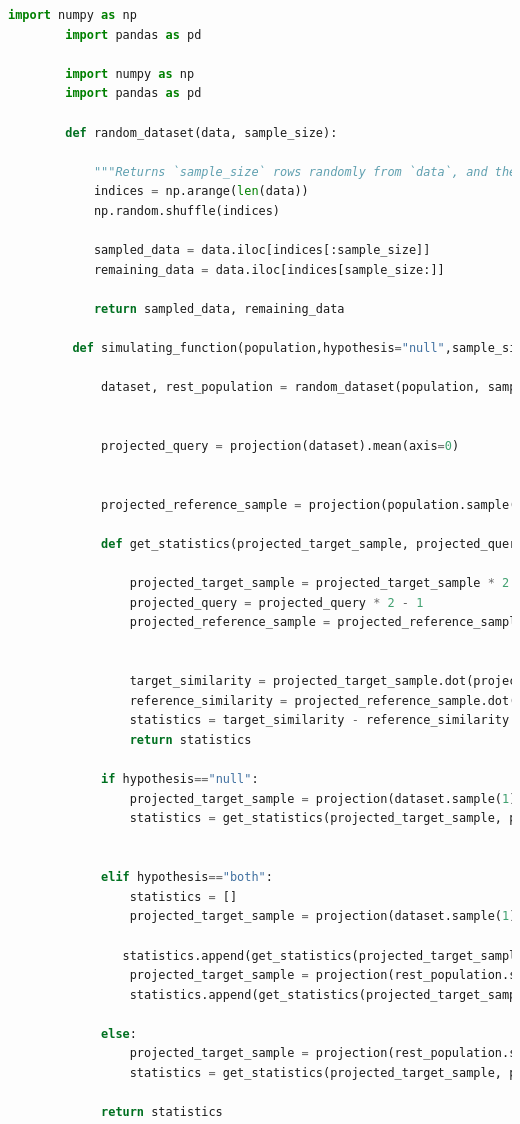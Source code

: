 \documentclass[12pt]{extarticle}
\begin{document}
	\begin{lstlisting}[language=Python]	
		import numpy as np
		import pandas as pd
		
		import numpy as np
		import pandas as pd
		
		def random_dataset(data, sample_size):
		
			"""Returns `sample_size` rows randomly from `data`, and the rest"""
			indices = np.arange(len(data))
			np.random.shuffle(indices)
			
			sampled_data = data.iloc[indices[:sample_size]]
			remaining_data = data.iloc[indices[sample_size:]]
			
			return sampled_data, remaining_data

		 def simulating_function(population,hypothesis="null",sample_size=5):	 
		 
			 dataset, rest_population = random_dataset(population, sample_size)
			 
			 
			 projected_query = projection(dataset).mean(axis=0)
			 
			 
			 projected_reference_sample = projection(population.sample(1).iloc[0])
			 
			 def get_statistics(projected_target_sample, projected_query, projected_reference_sample):
			 
				 projected_target_sample = projected_target_sample * 2 - 1
				 projected_query = projected_query * 2 - 1
				 projected_reference_sample = projected_reference_sample * 2 - 1
				 
				 
				 target_similarity = projected_target_sample.dot(projected_query)
				 reference_similarity = projected_reference_sample.dot(projected_query)
				 statistics = target_similarity - reference_similarity
				 return statistics
			 
			 if hypothesis=="null":
				 projected_target_sample = projection(dataset.sample(1).iloc[0])
				 statistics = get_statistics(projected_target_sample, projected_query, projected_reference_sample)
			 
			 
			 elif hypothesis=="both":
				 statistics = []
				 projected_target_sample = projection(dataset.sample(1).iloc[0])
			 
			 	statistics.append(get_statistics(projected_target_sample, projected_query, projected_reference_sample))
				 projected_target_sample = projection(rest_population.sample(1).iloc[0])
				 statistics.append(get_statistics(projected_target_sample, projected_query, projected_reference_sample))
			 
			 else:
				 projected_target_sample = projection(rest_population.sample(1).iloc[0])
				 statistics = get_statistics(projected_target_sample, projected_query, projected_reference_sample)
			 
			 return statistics
			
	\end{lstlisting} 
\end{document}
